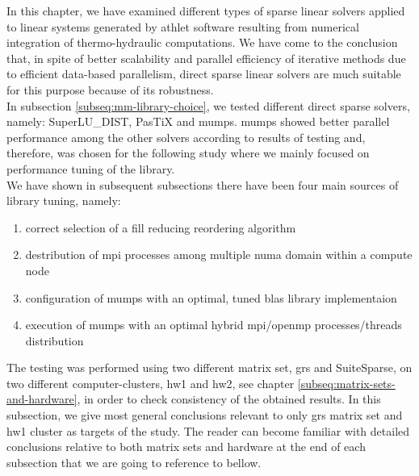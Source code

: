 \label{subseq:mm-conclusion}

In this chapter, we have examined different types of sparse linear solvers applied to linear systems generated by \gls{athlet} software resulting from numerical integration of thermo-hydraulic computations. We have come to the conclusion that, in spite of better scalability and parallel efficiency of iterative methods due to efficient data-based parallelism, direct sparse linear solvers are much suitable for this purpose because of its robustness.\\


In subsection \ref{subseq:mm-library-choice}, we tested different direct sparse solvers, namely: SuperLU\_DIST, PasTiX and \gls{mumps}. \gls{mumps} showed better parallel performance among the other solvers according to results of testing and, therefore, was chosen for the following study where we mainly focused on performance tuning of the library.\\


We have shown in subsequent subsections there have been four main sources of library tuning, namely:

\begin{enumerate}
	\item correct selection of a fill reducing reordering algorithm \label{conclusion:mm-1}
	\item destribution of \gls{mpi} processes among multiple \gls{numa} domain within a compute node \label{conclusion:mm-2}
	\item configuration of \gls{mumps} with an optimal, tuned \gls{blas} library implementaion \label{conclusion:mm-3}
	\item execution of \gls{mumps} with an optimal hybrid \gls{mpi}/\gls{openmp} processes/threads distribution \label{conclusion:mm-4}
\end{enumerate}


The testing was performed using two different matrix set, \gls{grs} and SuiteSparse, on two different computer-clusters, \gls{hw1} and \gls{hw2}, see chapter \ref{subseq:matrix-sets-and-hardware}, in order to check consistency of the obtained results. In this subsection, we  give most general conclusions relevant to only \gls{grs} matrix set and \gls{hw1} cluster as targets of the study. The reader can become familiar with detailed conclusions relative to both matrix sets and hardware at the end of each subsection that we are going to reference to bellow.\\



